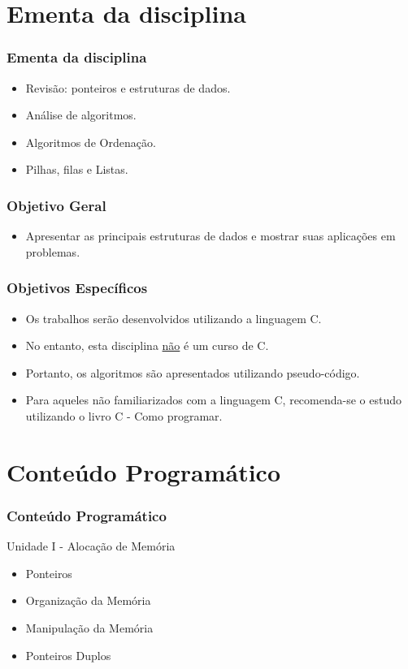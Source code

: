 \documentclass[aspectratio=169]{beamer}
\begin{document}
\section{Ementa da disciplina}

\begin{frame}
\frametitle{Ementa da disciplina}
\begin{itemize}
\item Revisão: ponteiros e estruturas de dados.
\item Análise de algoritmos.
\item Algoritmos de Ordenação.
\item Pilhas, filas e Listas. 
\end{itemize}
\end{frame}

\begin{frame}
\frametitle{Objetivo Geral}
\begin{itemize}
 \item Apresentar as principais estruturas de dados e mostrar suas aplicações em problemas.
\end{itemize}
\end{frame}

\begin{frame}
\frametitle{Objetivos Específicos}
\begin{itemize}
 \item Os trabalhos serão desenvolvidos utilizando a linguagem C.
 \item No entanto, esta disciplina \underline{não} é um curso de C.
 \item Portanto, os algoritmos são apresentados utilizando pseudo-código.
 \item Para aqueles não familiarizados com a linguagem C, recomenda-se o estudo utilizando o livro C - Como programar. 
\end{itemize}
\end{frame}


\section{Conteúdo Programático}

\begin{frame}
\frametitle{Conteúdo Programático}
Unidade I - Alocação de Memória
\begin{itemize}
 \item Ponteiros
 \item Organização da Memória
 \item Manipulação da Memória
 \item Ponteiros Duplos
\end{itemize}
\end{frame}
\end{document}
